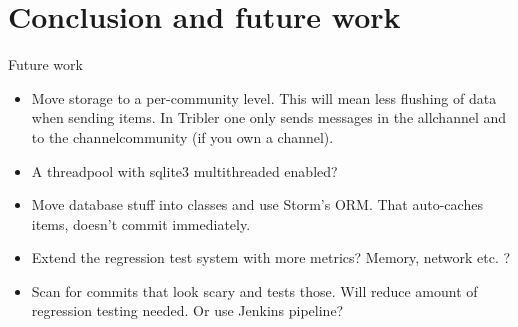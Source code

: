 \chapter{Conclusion and future work}
\label{cpt:conclusion_and_future_work}

Future work

\begin{itemize}
	\item Move storage to a per-community level. This will mean less flushing of data when sending items. In Tribler one only sends messages in the allchannel and to the channelcommunity (if you own a channel).
	\item A threadpool with sqlite3 multithreaded enabled? 
	\item Move database stuff into classes and use Storm's ORM. That auto-caches items, doesn't commit immediately.
	\item Extend the regression test system with more metrics? Memory, network etc. ?
	\item Scan for commits that look scary \cite{huang2014performance} and tests those. Will reduce amount of regression testing needed. Or use Jenkins pipeline?
\end{itemize}